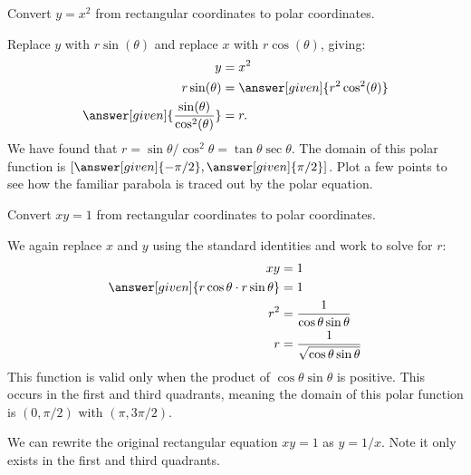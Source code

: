 \documentclass{ximera}
\begin{document}
\begin{example}
  Convert $y=x^2$ from rectangular coordinates to polar coordinates.
  \begin{explanation}
    Replace $y$ with $r\sin(\theta)$ and replace $x$ with $r\cos(\theta)$, giving:
      \begin{align*}
	y &=x^2\\
	r\sin(\theta) &= \answer[given]{r^2\cos^2(\theta)}\\
	\answer[given]{\frac{\sin(\theta)}{\cos^2(\theta)}}  &= r.
      \end{align*}
      We have found that $r=\sin\theta/\cos^2\theta =
      \tan\theta\sec\theta$. The domain of this polar function is
      $[\answer[given]{-\pi/2},\answer[given]{\pi/2}]$. Plot a few
      points to see how the familiar parabola is traced out by the
      polar equation.
  \end{explanation}
\end{example}

\begin{example}
  Convert $xy = 1$ from rectangular coordinates to polar coordinates.
  \begin{explanation}
    We again replace $x$ and $y$ using the standard identities and
    work to solve for $r$:
    \begin{align*}
	xy &= 1 \\
	\answer[given]{r\cos\theta\cdot r\sin\theta} & = 1\\
	r^2 & = \frac{1}{\cos\theta\sin\theta}\\
	r & = \frac{1}{\sqrt{\cos\theta\sin\theta}}\\
    \end{align*}
    This function is valid only when the product of
    $\cos\theta\sin\theta$ is positive. This occurs in the first and
    third quadrants, meaning the domain of this polar function is
    $(0,\pi/2)$ with $(\pi,3\pi/2)$.
      
    We can rewrite the original rectangular equation $xy=1$ as
    $y=1/x$. Note it only exists in the first and third quadrants.
  \end{explanation}
\end{example}
\end{document}
